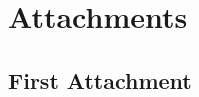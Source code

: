 \documentclass[12pt,a4paper]{report}
\begin{document}



\tableofcontents

\clearpage
{}











\listoffigures

\listoftables



\ifx\ThesisType\TypePhD
{}
\fi

\appendix
\chapter{Attachments}

\section{First Attachment}
\end{document}
